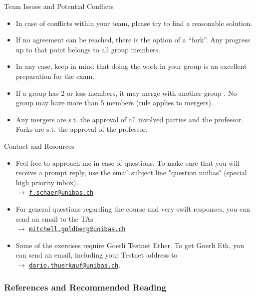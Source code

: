 \documentclass[handout]{beamer}
\begin{document}
\begin{frame}{Team Issues and Potential Conflicts}
\begin{itemize}
	\item<1-> In case of conflicts within your team, please try to find a \color{focus} reasonable solution\color{black}. 
	\item<2-> If no agreement can be reached, there is \color{focus} the option of a ``fork''\color{black}. Any progress up to that point belongs to all group members. 
	\item<3-> In any case, keep in mind that doing the work in your group is an \color{focus} excellent preparation for the exam\color{black}. 
	\item<4-> If a group \color{focus} has 2 or less members, it may merge with another group \color{black}. No group may have more than 5 members (rule applies to mergers). 
	\item<5-> Any mergers are \color{focus} s.t. the approval \color{black} of all involved parties and the professor. Forks are s.t. the approval of the professor.
\end{itemize}
\end{frame}


\begin{frame}{Contact and Resources}
\begin{itemize}
	\item<1-> Feel free to approach me in case of questions. To make sure that you will receive a prompt reply, use the email subject line "question unibas" (special high priority inbox). \\ $\rightarrow$ \href{mailto:f.schaer@unibas.ch?subject=question\%20unibas}{\texttt{f.schaer@unibas.ch}}
	\item<2-> For general questions regarding the course and very swift responses, you can send an email to the TAs \\$\rightarrow$ \href{mailto:mitchell.goldberg@unibas.ch?subject=question\%20unibas}{\texttt{mitchell.goldberg@unibas.ch}}
	\item<3-> Some of the exercises require Goerli Testnet Ether. To get Goerli Eth, you can send an email, including your Testnet address to \\
	$\rightarrow$ \href{mailto:dario.thuerkauf@unibas.ch?subject=Goerli\%20ETH}{\texttt{dario.thuerkauf@unibas.ch}}.
\end{itemize}
\end{frame}


\begin{frame}%
\frametitle{References and Recommended Reading}
	
	
\end{frame}
\end{document}
